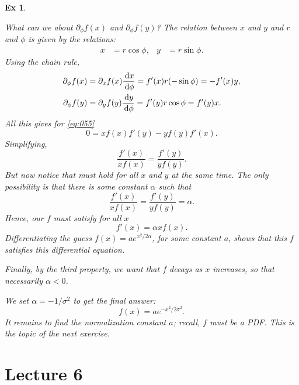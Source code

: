 \documentclass[a4paper,11pt]{article}
\newtheorem{exercise}[theorem]{Ex}
\begin{document}
\begin{exercise}
\begin{solution}
What can we about $\partial_{\phi} f(x)$ and $\partial_{\phi}f(y)$?
The relation between $x$ and $y$ and $r$ and $\phi$ is given by the relations:
\begin{align}
\label{eq:056}
x &= r \cos \phi, & y&=r\sin \phi.
\end{align}
Using the chain rule,
\begin{align}
  \label{eq:057}
  \partial_{\phi} f(x) &= \partial_{x} f(x) \frac{\,\textrm{d}x}{\,\textrm{d}\phi} = f'(x) r (-\sin \phi) = - f'(x) y, \\
  \partial_{\phi} f(y) &= \partial_{y} f(y) \frac{\,\textrm{d}y}{\,\textrm{d}\phi} = f'(y) r \cos \phi =  f'(y) x.
\end{align}
All this gives for \cref{eq:055}
\begin{equation}
\label{eq:058}
0 = x f(x) f'(y) - y f(y)f'(x).
\end{equation}
Simplifying,
\begin{equation}
  \label{eq:059}
   \frac{f'(x)}{x f(x)} = \frac{f'(y)}{ y f(y)}.
\end{equation}
But now notice that must hold for all $x$ and $y$ at the same time. The only possibility is that there is some constant $\alpha$ such that
\begin{equation}
\label{eq:0510}
   \frac{f'(x)}{x f(x)} =  \frac{f'(y)}{y f(y)} = \alpha.
\end{equation}
Hence, our $f$ must satisfy for all $x$
\begin{equation}
\label{eq:0511}
f'(x) = \alpha x f(x).
\end{equation}
Differentiating the guess $f(x) = a e^{ x^2/{2 \alpha}}$, for some constant $a$, shows that this $f$ satisfies this differential equation.

Finally, by the third property, we want that $f$ decays as $x$ increases, so that necessarily $\alpha<0$.


We set $\alpha = -1/\sigma^{2}$ to get the final answer:
\begin{equation}
  \label{eq:0512}
  f(x) = a e^{-x^{2}/2 \sigma^{2}}.
\end{equation}
It remains to find the normalization constant $a$; recall, $f$ must be a PDF. This is the topic of the next exercise.
\end{solution}
\end{exercise}

\section{Lecture 6}
\end{document}
